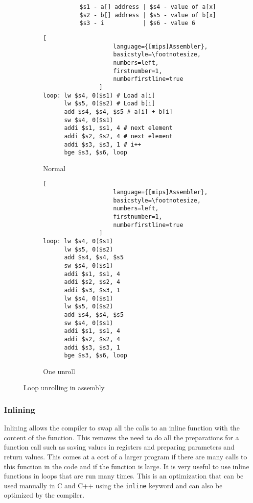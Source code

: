 \ifrelease
\begin{figure}
    \centering
    \begin{adjustbox}{minipage=\linewidth,scale=0.8}
        \begin{verbatim}
                $s1 - a[] address | $s4 - value of a[x]
                $s2 - b[] address | $s5 - value of b[x]
                $s3 - i           | $s6 - value 6
        \end{verbatim}
        \begin{subfigure}{.55\textwidth}
            \centering
            \begin{lstlisting}[
                    language={[mips]Assembler},
                    basicstyle=\footnotesize,
                    numbers=left,
                    firstnumber=1,
                    numberfirstline=true
                ]
loop: lw $s4, 0($s1) # Load a[i]
      lw $s5, 0($s2) # Load b[i]
      add $s4, $s4, $s5 # a[i] + b[i]
      sw $s4, 0($s1)
      addi $s1, $s1, 4 # next element
      addi $s2, $s2, 4 # next element
      addi $s3, $s3, 1 # i++
      bge $s3, $s6, loop
                \end{lstlisting}
            \caption{Normal}
            \label{fig:unroll:sub1}
        \end{subfigure}%
        \begin{subfigure}{.3\textwidth}
            \centering
            \begin{lstlisting}[
                    language={[mips]Assembler},
                    basicstyle=\footnotesize,
                    numbers=left,
                    firstnumber=1,
                    numberfirstline=true
                ]
loop: lw $s4, 0($s1)
      lw $s5, 0($s2)
      add $s4, $s4, $s5
      sw $s4, 0($s1)
      addi $s1, $s1, 4
      addi $s2, $s2, 4
      addi $s3, $s3, 1
      lw $s4, 0($s1)
      lw $s5, 0($s2)
      add $s4, $s4, $s5
      sw $s4, 0($s1)
      addi $s1, $s1, 4
      addi $s2, $s2, 4
      addi $s3, $s3, 1
      bge $s3, $s6, loop
                \end{lstlisting}
            \caption{One unroll}
            \label{fig:unroll:sub2}
        \end{subfigure}
    \end{adjustbox}
    \caption{Loop unrolling in assembly}
    \label{fig:assembly:unroll}
\end{figure}
\fi


\subsubsection{Inlining}
Inlining allows the compiler to swap all the calls to an inline function with the content of the function. This removes the need to do all the preparations for a function call such as saving values in registers and preparing parameters and return values. This comes at a cost of a larger program if there are many calls to this function in the code and if the function is large. It is very useful to use inline functions in loops that are run many times. This is an optimization that can be used manually in C and C++ using the \texttt{inline} keyword and can also be optimized by the compiler.

